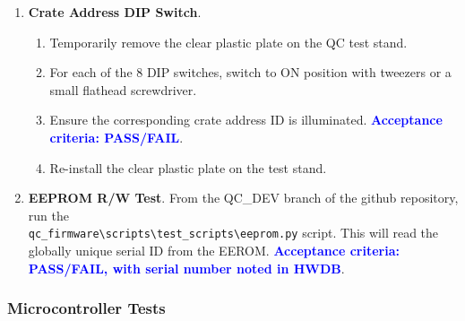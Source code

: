 \documentclass[a4paper,12pt]{article}
\begin{document}
    \begin{enumerate}
        \item \textbf{Crate Address DIP Switch}. 
            \begin{enumerate}
                \item Temporarily remove the clear plastic plate on the QC test stand.
                \item For each of the 8 DIP switches, switch to ON position with tweezers or a small flathead screwdriver.
                \item Ensure the corresponding crate address ID is illuminated. \textcolor{blue}{\textbf{Acceptance criteria: PASS/FAIL}}.
                \item Re-install the clear plastic plate on the test stand.
            \end{enumerate}
        \item \textbf{EEPROM R/W Test}. From the QC\_DEV branch of the github repository, run the \\ 
        \verb|qc_firmware\scripts\test_scripts\eeprom.py| script. This will read the globally unique serial ID from the EEROM. \textcolor{blue}{\textbf{Acceptance criteria: PASS/FAIL, with serial number noted in HWDB}}.
    \end{enumerate}

\subsubsection{Microcontroller Tests}
\label{section:mcu_tests}
\end{document}
